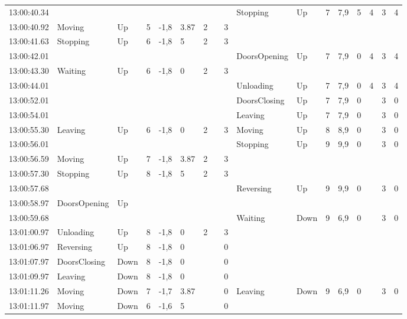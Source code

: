 \documentclass{UoYCSproject}
\begin{document}
\begin{landscape}
\begin{longtable}{l || l | l | l | l | l | l | l | l || l | l | l | l | l | l | l | l}
	13:00:40.34 &  &  &  &  &  &  &  &  & Stopping & Up & 7 & 7,9 & 5 & 4 & 3 & 4 \\
	13:00:40.92 & Moving & Up & 5 & -1,8 & 3.87 & 2 &  & 3 &  &  &  &  &  &  &  &  \\
	13:00:41.63 & Stopping & Up & 6 & -1,8 & 5 & 2 &  & 3 &  &  &  &  &  &  &  &  \\
	13:00:42.01 &  &  &  &  &  &  &  &  & DoorsOpening & Up & 7 & 7,9 & 0 & 4 & 3 & 4 \\
	13:00:43.30 & Waiting & Up & 6 & -1,8 & 0 & 2 &  & 3 &  &  &  &  &  &  &  &  \\
	13:00:44.01 &  &  &  &  &  &  &  &  & Unloading & Up & 7 & 7,9 & 0 & 4 & 3 & 4 \\
	13:00:52.01 &  &  &  &  &  &  &  &  & DoorsClosing & Up & 7 & 7,9 & 0 &  & 3 & 0 \\
	13:00:54.01 &  &  &  &  &  &  &  &  & Leaving & Up & 7 & 7,9 & 0 &  & 3 & 0 \\
	13:00:55.30 & Leaving & Up & 6 & -1,8 & 0 & 2 &  & 3 & Moving & Up & 8 & 8,9 & 0 &  & 3 & 0 \\
	13:00:56.01 &  &  &  &  &  &  &  &  & Stopping & Up & 9 & 9,9 & 0 &  & 3 & 0 \\
	13:00:56.59 & Moving & Up & 7 & -1,8 & 3.87 & 2 &  & 3 &  &  &  &  &  &  &  &  \\
	13:00:57.30 & Stopping & Up & 8 & -1,8 & 5 & 2 &  & 3 &  &  &  &  &  &  &  &  \\
	13:00:57.68 &  &  &  &  &  &  &  &  & Reversing & Up & 9 & 9,9 & 0 &  & 3 & 0 \\
	13:00:58.97 & DoorsOpening & Up &  &  &  &  &  &  &  &  &  &  &  &  &  &  \\
	13:00:59.68 &  &  &  &  &  &  &  &  & Waiting & Down & 9 & 6,9 & 0 &  & 3 & 0 \\
	13:01:00.97 & Unloading & Up & 8 & -1,8 & 0 & 2 &  & 3 &  &  &  &  &  &  &  &  \\
	13:01:06.97 & Reversing & Up & 8 & -1,8 & 0 &  &  & 0 &  &  &  &  &  &  &  &  \\
	13:01:07.97 & DoorsClosing & Down & 8 & -1,8 & 0 &  &  & 0 &  &  &  &  &  &  &  &  \\
	13:01:09.97 & Leaving & Down & 8 & -1,8 & 0 &  &  & 0 &  &  &  &  &  &  &  &  \\
	13:01:11.26 & Moving & Down & 7 & -1,7 & 3.87 &  &  & 0 & Leaving & Down & 9 & 6,9 & 0 &  & 3 & 0 \\
	13:01:11.97 & Moving & Down & 6 & -1,6 & 5 &  &  & 0 &  &  &  &  &  &  &  &  \\

\end{longtable}
\end{landscape}
\end{document}
